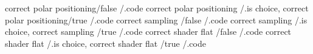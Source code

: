 correct polar positioning/false      /.code
correct polar positioning            /.is choice,
correct polar positioning/true       /.code
correct sampling         /false      /.code
correct sampling                     /.is choice,
correct sampling         /true       /.code
correct shader flat      /false      /.code
correct shader flat                  /.is choice,
correct shader flat      /true       /.code

